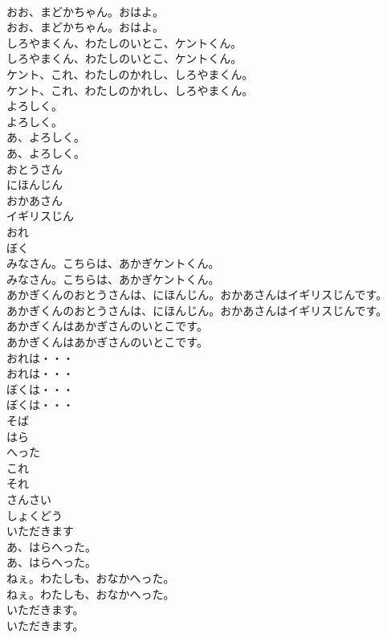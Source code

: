 \documentclass[8pt]{extreport}
\begin{document}
\begin{CJK}{UTF8}{min}
\\	おお、まどかちゃん。おはよ。	
\\	おお、まどかちゃん。おはよ。 
\\	しろやまくん、わたしのいとこ、ケントくん。	
\\	しろやまくん、わたしのいとこ、ケントくん。 
\\	ケント、これ、わたしのかれし、しろやまくん。	
\\	ケント、これ、わたしのかれし、しろやまくん。 
\\	よろしく。	
\\	よろしく。 
\\	あ、よろしく。	
\\	あ、よろしく。 
\\	おとうさん
\\	にほんじん
\\	おかあさん
\\	イギリスじん
\\	おれ
\\	ぼく
\\	みなさん。こちらは、あかぎケントくん。	
\\	みなさん。こちらは、あかぎケントくん。 
\\	あかぎくんのおとうさんは、にほんじん。おかあさんはイギリスじんです。	
\\	あかぎくんのおとうさんは、にほんじん。おかあさんはイギリスじんです。 
\\	あかぎくんはあかぎさんのいとこです。	
\\	あかぎくんはあかぎさんのいとこです。 
\\	おれは・・・	
\\	おれは・・・ 
\\	ぼくは・・・	
\\	ぼくは・・・ 
\\	そば
\\	はら
\\	へった
\\	これ
\\	それ
\\	さんさい
\\	しょくどう
\\	いただきます
\\	あ、はらへった。	
\\	あ、はらへった。 
\\	ねぇ。わたしも、おなかへった。	
\\	ねぇ。わたしも、おなかへった。 
\\	いただきます。	
\\	いただきます。 

\end{CJK}
\end{document}
